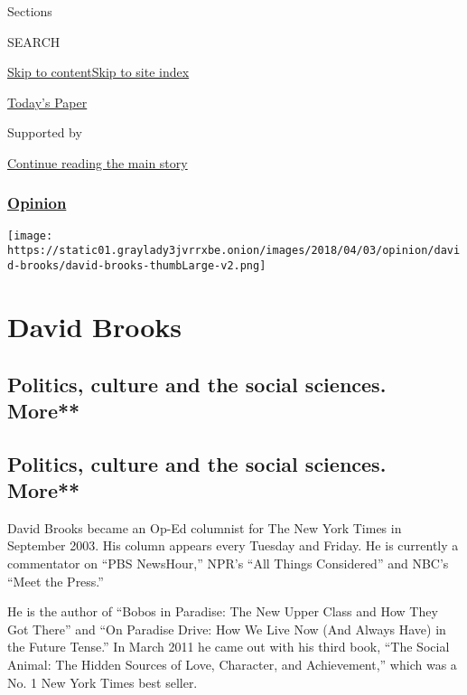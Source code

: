 Sections

SEARCH

\protect\hyperlink{site-content}{Skip to
content}\protect\hyperlink{site-index}{Skip to site index}

\href{https://myaccount.nytimes3xbfgragh.onion/auth/login?response_type=cookie\&client_id=vi}{}

\href{https://www.nytimes3xbfgragh.onion/section/todayspaper}{Today's
Paper}

Supported by

\protect\hyperlink{after-sponsor}{Continue reading the main story}

\hypertarget{opinion}{%
\subsubsection{\texorpdfstring{\href{/section/opinion}{Opinion}}{Opinion}}\label{opinion}}

\texttt{[image: https://static01.graylady3jvrrxbe.onion/images/2018/04/03/opinion/david-brooks/david-brooks-thumbLarge-v2.png]}

\hypertarget{david-brooks}{%
\section{David Brooks}\label{david-brooks}}

\hypertarget{politics-culture-and-the-social-sciences-more}{%
\subsection{Politics, culture and the social sciences.
More**}\label{politics-culture-and-the-social-sciences-more}}

\hypertarget{politics-culture-and-the-social-sciences-more-1}{%
\subsection{Politics, culture and the social sciences.
More**}\label{politics-culture-and-the-social-sciences-more-1}}

David Brooks became an Op-Ed columnist for The New York Times in
September 2003. His column appears every Tuesday and Friday. He is
currently a commentator on ``PBS NewsHour,'' NPR's ``All Things
Considered'' and NBC's ``Meet the Press.''

He is the author of ``Bobos in Paradise: The New Upper Class and How
They Got There'' and ``On Paradise Drive: How We Live Now (And Always
Have) in the Future Tense.'' In March 2011 he came out with his third
book, ``The Social Animal: The Hidden Sources of Love, Character, and
Achievement,'' which was a No. 1 New York Times best seller.

